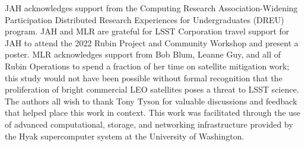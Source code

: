 \documentclass[twocolumn]{aastex631}
\begin{document}
{}


\begin{acknowledgments}
JAH acknowledges support from the Computing Research Association-Widening Participation Distributed Research Experiences for Undergraduates (DREU) program.
JAH and MLR are grateful for LSST Corporation travel support for JAH to attend the 2022 Rubin Project and Community Workshop and present a poster.
MLR acknowledges support from Bob Blum, Leanne Guy, and all of Rubin Operations to spend a fraction of her time on satellite mitigation work; this study would not have been possible without formal recognition that the proliferation of bright commercial LEO satellites poses a threat to LSST science.
The authors all wish to thank Tony Tyson for valuable discussions and feedback that helped place this work in context.
This work was facilitated through the use of advanced computational, storage, and networking infrastructure provided by the Hyak supercomputer system at the University of Washington.
\end{acknowledgments}
\end{document}

